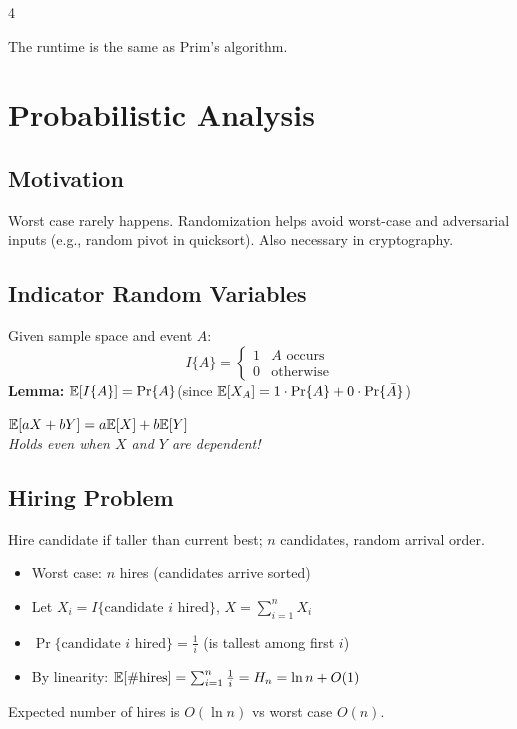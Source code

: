 \documentclass[8pt,a4paper,landscape]{extarticle}
\begin{document}
\begin{multicols*}{4}
\begin{prop}[title=Runtime]
The runtime is the same as Prim's algorithm.
\end{prop}

\newpage
\section{Probabilistic Analysis}

\subsection{Motivation}
Worst case rarely happens. Randomization helps avoid worst-case and adversarial inputs (e.g., random pivot in quicksort). Also necessary in cryptography.

\subsection{Indicator Random Variables}

\begin{defn}[title=Indicator RV]
Given sample space and event $A$:
\[I\{A\} = \begin{cases}1 & A\text{ occurs}\\0 & \text{otherwise}\end{cases}\]
\textbf{Lemma:} $\mathbb{E}[I\{A\}] = \Pr\{A\}$\quad (since $\mathbb{E}[X_A]=1\cdot\Pr\{A\}+0\cdot\Pr\{\bar{A}\}$)
\end{defn}

\begin{thm}[title=Linearity of expectation]
$\mathbb{E}[aX+bY] = a\mathbb{E}[X]+b\mathbb{E}[Y]$\\
\emph{Holds even when $X$ and $Y$ are dependent!}
\end{thm}

\subsection{Hiring Problem}
Hire candidate if taller than current best; $n$ candidates, random arrival order.
\begin{itemize}
  \item Worst case: $n$ hires (candidates arrive sorted)
  \item Let $X_i = I\{\text{candidate }i\text{ hired}\}$, $X = \sum_{i=1}^n X_i$
  \item $\Pr\{\text{candidate }i\text{ hired}\} = \frac{1}{i}$ (is tallest among first $i$)
  \item By linearity: $\mathbb{E}[\#\text{hires}] = \sum_{i=1}^{n}\frac{1}{i} = H_n = \ln n + O(1)$
\end{itemize}
Expected number of hires is $O(\ln n)$ vs worst case $O(n)$.


\end{multicols*}
\end{document}
